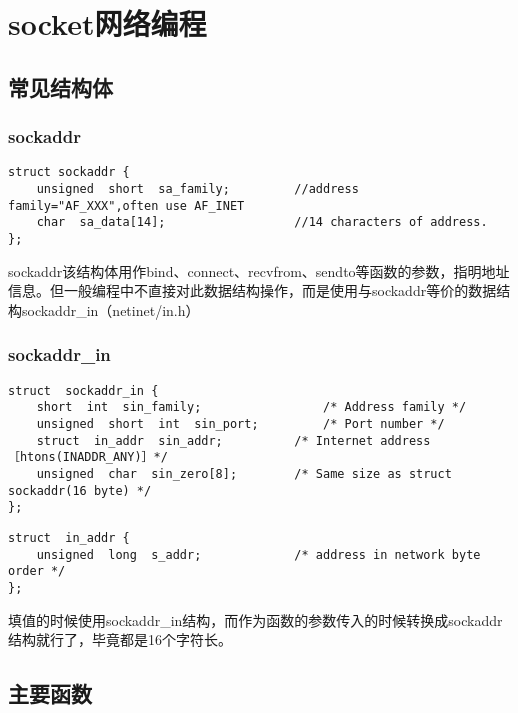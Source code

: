 \section{socket网络编程}
\subsection{常见结构体}
\subsubsection{sockaddr}
%
\begin{lstlisting}[style=C]
struct sockaddr {
	unsigned  short  sa_family;     	//address family="AF_XXX",often use AF_INET
	char  sa_data[14];  				//14 characters of address.            
};
\end{lstlisting}
sockaddr该结构体用作bind、connect、recvfrom、sendto等函数的参数，指明地址信息。但一般编程中不直接对此数据结构操作，而是使用与sockaddr等价的数据结构sockaddr\_{}in（netinet/in.h）

\subsubsection{sockaddr\_{}in}
\begin{lstlisting}[style=C]
struct  sockaddr_in {
	short  int  sin_family; 				/* Address family */
	unsigned  short  int  sin_port; 		/* Port number */
	struct  in_addr  sin_addr;			/* Internet address ［htons(INADDR_ANY)］*/
	unsigned  char  sin_zero[8]; 		/* Same size as struct sockaddr(16 byte) */
};
\end{lstlisting}
\begin{lstlisting}[style=C]
struct  in_addr {
	unsigned  long  s_addr;				/* address in network byte order */
};
\end{lstlisting}
填值的时候使用sockaddr\_{}in结构，而作为函数的参数传入的时候转换成sockaddr结构就行了，毕竟都是16个字符长。


\subsection{主要函数}
